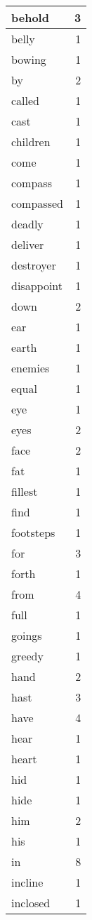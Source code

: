 \begin{center}
\begin{longtable}{l|r}
behold & 3 \\ \hline
belly & 1 \\ \hline
bowing & 1 \\ \hline
by & 2 \\ \hline
called & 1 \\ \hline
cast & 1 \\ \hline
children & 1 \\ \hline
come & 1 \\ \hline
compass & 1 \\ \hline
compassed & 1 \\ \hline
deadly & 1 \\ \hline
deliver & 1 \\ \hline
destroyer & 1 \\ \hline
disappoint & 1 \\ \hline
down & 2 \\ \hline
ear & 1 \\ \hline
earth & 1 \\ \hline
enemies & 1 \\ \hline
equal & 1 \\ \hline
eye & 1 \\ \hline
eyes & 2 \\ \hline
face & 2 \\ \hline
fat & 1 \\ \hline
fillest & 1 \\ \hline
find & 1 \\ \hline
footsteps & 1 \\ \hline
for & 3 \\ \hline
forth & 1 \\ \hline
from & 4 \\ \hline
full & 1 \\ \hline
goings & 1 \\ \hline
greedy & 1 \\ \hline
hand & 2 \\ \hline
hast & 3 \\ \hline
have & 4 \\ \hline
hear & 1 \\ \hline
heart & 1 \\ \hline
hid & 1 \\ \hline
hide & 1 \\ \hline
him & 2 \\ \hline
his & 1 \\ \hline
in & 8 \\ \hline
incline & 1 \\ \hline
inclosed & 1 \\ \hline

\end{longtable}
\end{center}
